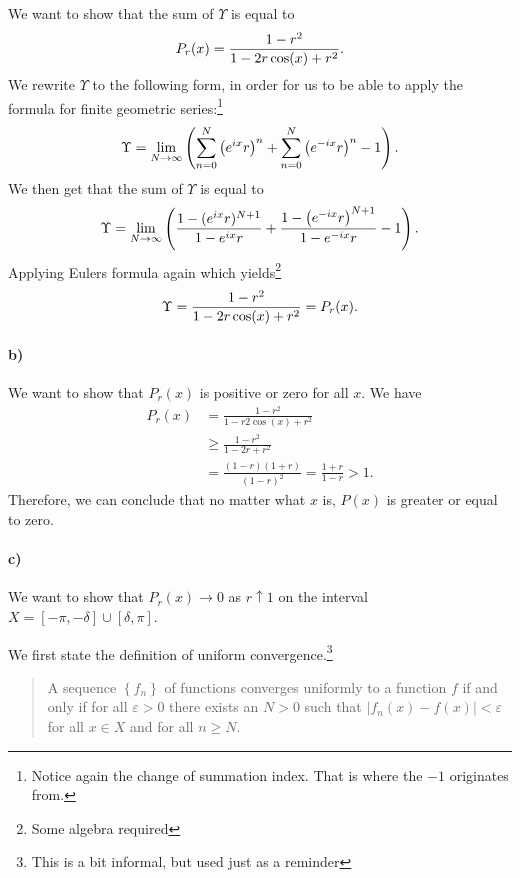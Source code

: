 \documentclass[a4paper]{article}
\begin{document}
We want to show that the sum of $\Upsilon$ is equal to
\begin{equation}
  \notag
  P_r(x) = \frac{1 - r^2}{1 - 2r\cos(x) + r^2}.
\end{equation}
We rewrite $\Upsilon$ to the following form, in order for us to be able to apply the formula for
finite geometric series:\footnote{Notice again the change of summation index. That is where the $-1$ originates from.}
\begin{equation}
  \notag
  \Upsilon = \lim\limits_{N \rightarrow \infty}\left(\sum_{n=0}^{N}\left( e^{ix}r \right)^n + \sum_{n=0}^{N}\left(e^{-ix}r\right)^{n} - 1\right).
\end{equation}
We then get that the sum of $\Upsilon$ is equal to
\begin{equation}
  \notag
  \Upsilon = \lim\limits_{N\rightarrow\infty} \left(\frac{1 - (e^{ix}r)^{N+1}}{1 - e^{ix}r} + \frac{1-\left( e^{-ix}r \right)^{N+1}}{1 - e^{-ix}r} - 1\right).
\end{equation}
Applying Eulers formula again which yields\footnote{Some algebra required}
\begin{equation}
  \notag
  \Upsilon = \frac{1 - r^{2}}{1 - 2r\cos(x) + r^{2}} = P_r(x).
\end{equation}

\paragraph{b)}
We want to show that $P_r(x)$ is positive or zero for all $x$. 
We have
\begin{align*}
  P_r(x) &= \frac{1 - r^{2}}{1 - r2\cos(x) + r^{2}} \\
  &\geq \frac{1 - r^{2}}{1 - 2r + r^{2}}\\
  & = \frac{(1 - r)(1 + r)}{(1-r)^{2}} = \frac{1 + r}{1 - r} > 1.
\end{align*}
Therefore, we can conclude that no matter what $x$ is, $P(x)$ is greater or
equal to zero.

\paragraph{c)}
We want to show that $P_r(x) \rightarrow 0$ as $r\uparrow 1$ on the interval $X = \left[ -\pi, -\delta \right]\cup\left[ \delta, \pi \right]$.

We first state the definition of uniform convergence.\footnote{This is a bit informal, but used just as a reminder}

\begin{quote}
  A sequence $\left\{ f_n \right\}$ of functions converges uniformly to a function $f$
  if and only if for all $\varepsilon > 0$ there exists an $N > 0$ such that $|f_n(x) - f(x)| < \varepsilon$ for all $x \in X$ and for all $n \geq N$.
\end{quote}
\end{document}
